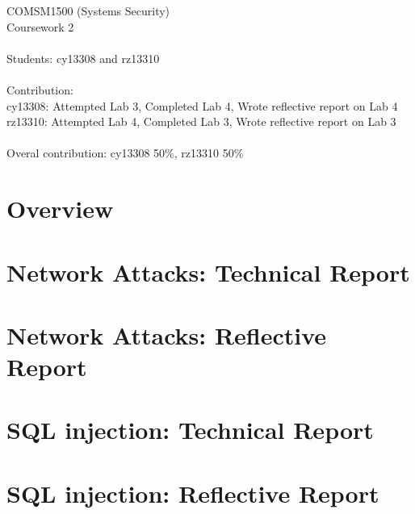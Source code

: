 \documentclass[11pt, onecolumn]{article}
\newcommand\tab[1][1cm]{\hspace*{#1}}
\begin{document}
COMSM1500 (Systems Security)\\
Coursework 2\\
\\
Students: cy13308 and rz13310 \\
\\
Contribution: \\
\tab[1cm] cy13308: Attempted Lab 3, Completed Lab 4, Wrote reflective report on Lab 4\\
\tab[1cm] rz13310: Attempted Lab 4, Completed Lab 3, Wrote reflective report on Lab 3
\\
\\
Overal contribution: cy13308 50\%, rz13310 50\%
\newpage


\section{Overview}


\newpage
\section{Network Attacks: Technical Report}


\newpage
\section{Network Attacks: Reflective Report}


\newpage
\section{SQL injection: Technical Report}


\newpage
\section{SQL injection: Reflective Report}



\newpage
{}

\end{document}
